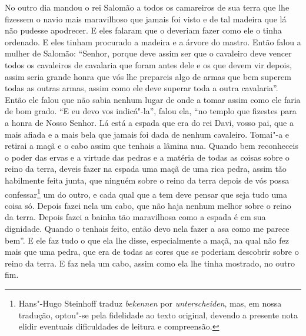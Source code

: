 No outro dia mandou o rei Salomão a todos os camareiros de sua terra que lhe
fizessem o navio mais maravilhoso que jamais foi visto e de tal madeira que lá
não pudesse apodrecer. E eles falaram que o deveriam fazer como ele o tinha
ordenado. E eles tinham procurado a madeira e a árvore do mastro. Então falou a
mulher de Salomão: “Senhor, porque deve assim ser que o cavaleiro deve vencer
todos os cavaleiros de cavalaria que foram antes dele e os que devem vir
depois, assim seria grande honra que vós lhe prepareis algo de armas que bem
superem todas as outras armas, assim como ele deve superar toda a outra
cavalaria”. Então ele falou que não sabia nenhum lugar de onde a tomar
assim como ele faria de bom grado. “E eu devo vos indicá"-la”, falou ela, “no
templo que fizestes para a honra de Nosso Senhor. Lá está a espada que era do
rei Davi, vosso pai, que a mais afiada e a mais bela que jamais foi dada de
nenhum cavaleiro. Tomai"-a e retirai a maçã e o cabo assim que tenhais a lâmina
nua. Quando bem reconheceis o poder das ervas e a virtude das pedras e a
matéria de todas as coisas sobre o reino da terra, deveis fazer na espada uma
maçã de uma rica pedra, assim tão habilmente feita junta, que ninguém sobre o
reino da terra depois de vós possa confessar\footnote{ Hans"-Hugo Steinhoff
traduz \textit{bekennen}  por \textit{unterscheiden},
mas, em nossa tradução, optou"-se pela fidelidade ao texto
original, devendo a presente nota elidir eventuais dificuldades de leitura e
compreensão.}  um do outro, e cada qual que a tem deve pensar que
seja tudo uma coisa só. Depois fazei nela um cabo, que não haja nenhum melhor
sobre o reino da terra. Depois fazei a bainha tão maravilhosa como a espada é
em sua dignidade. Quando o tenhais feito, então devo nela fazer a asa como me
parece bem”. E ele faz tudo o que ela lhe disse, especialmente a maçã, na qual
não fez mais que uma pedra, que era de todas as cores que se poderiam descobrir
sobre o reino da terra. E faz nela um cabo, assim como ela lhe tinha mostrado,
no outro fim. 

